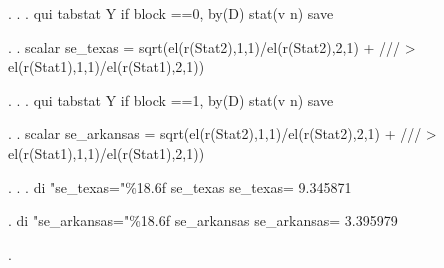. 
. 
. qui tabstat Y if block ==0, by(D) stat(v n) save        

. 
. scalar se_texas = sqrt(el(r(Stat2),1,1)/el(r(Stat2),2,1) + /// 
>                                         el(r(Stat1),1,1)/el(r(Stat1),2,1))

.                                         
. 
. qui tabstat Y if block ==1, by(D) stat(v n) save        

. 
. scalar se_arkansas = sqrt(el(r(Stat2),1,1)/el(r(Stat2),2,1) + /// 
>                                         el(r(Stat1),1,1)/el(r(Stat1),2,1))

. 
. 
. di "se_texas="\%18.6f se_texas
se_texas=          9.345871

. di "se_arkansas="\%18.6f se_arkansas
se_arkansas=          3.395979

. 
